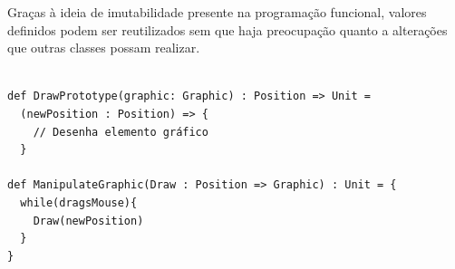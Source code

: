 Graças à ideia de imutabilidade presente na 
programação funcional, valores definidos podem 
ser reutilizados sem que haja preocupação 
quanto a alterações que outras classes possam 
realizar. 

\begin{lstlisting}[caption={Prototype Funcional},label=fpprototype]
    
def DrawPrototype(graphic: Graphic) : Position => Unit =
  (newPosition : Position) => {
    // Desenha elemento gráfico
  }

def ManipulateGraphic(Draw : Position => Graphic) : Unit = {
  while(dragsMouse){
    Draw(newPosition)
  }
}
    
\end{lstlisting}